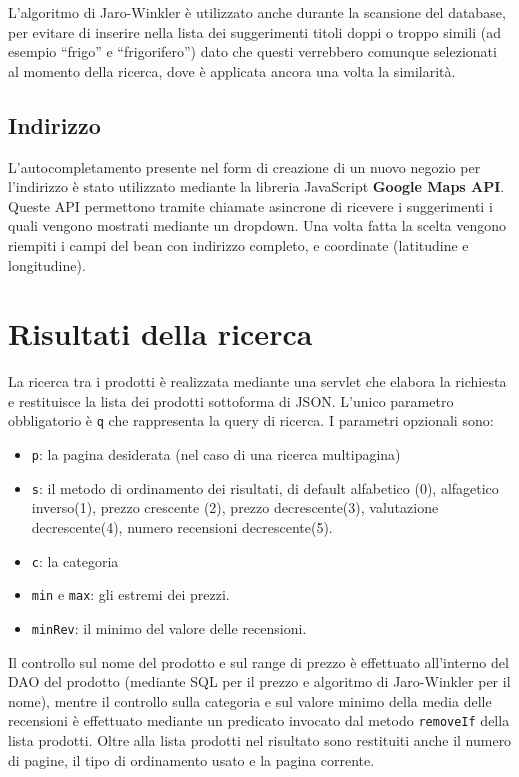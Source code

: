 L'algoritmo di Jaro-Winkler è utilizzato anche durante la scansione del database, per evitare di inserire nella lista dei suggerimenti titoli doppi o troppo simili (ad esempio ``frigo'' e ``frigorifero'') dato che questi verrebbero comunque selezionati al momento della ricerca, dove è applicata ancora una volta la similarità.

\section{Indirizzo}
L'autocompletamento presente nel form di creazione di un nuovo negozio per l'indirizzo è stato utilizzato mediante la libreria JavaScript \textbf{Google Maps API}. Queste API permettono tramite chiamate asincrone di ricevere i suggerimenti i quali vengono mostrati mediante un dropdown. Una volta fatta la scelta vengono riempiti i campi del bean con indirizzo completo, e coordinate (latitudine e longitudine).

\chapter{Risultati della ricerca}
La ricerca tra i prodotti è realizzata mediante una servlet che elabora la richiesta e restituisce la lista dei prodotti sottoforma di JSON. L'unico parametro obbligatorio è \texttt{q} che rappresenta la query di ricerca.
I parametri opzionali sono:
\begin{itemize}
  \item \texttt{p}: la pagina desiderata (nel caso di  una ricerca multipagina)
  \item \texttt{s}: il metodo di ordinamento dei risultati, di default alfabetico (0), alfagetico inverso(1), prezzo crescente (2), prezzo decrescente(3), valutazione decrescente(4),  numero recensioni decrescente(5).
  \item \texttt{c}: la categoria
  \item \texttt{min} e \texttt{max}: gli estremi dei prezzi.
  \item \texttt{minRev}: il minimo del valore delle recensioni.
\end{itemize}
Il controllo sul nome del prodotto e sul range di prezzo è effettuato all'interno del DAO del prodotto (mediante SQL per il prezzo e algoritmo di Jaro-Winkler per il nome), mentre il controllo sulla categoria e sul valore minimo della media delle recensioni è effettuato mediante un predicato invocato dal metodo \texttt{removeIf} della lista prodotti.
Oltre alla lista prodotti nel risultato sono restituiti anche il numero di pagine, il tipo di ordinamento usato e la pagina corrente.


